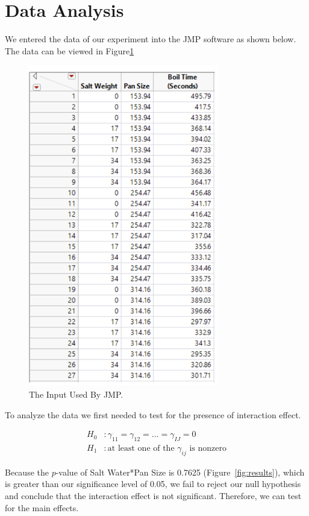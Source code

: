 \documentclass[12pt,titlepage=false]{scrartcl}
\begin{document}
\section{Data Analysis}
\label{sec:data_analysis}
We entered the data of our experiment into the JMP software as shown below. The data can be viewed in Figure\ref{fig:inputs}

\begin{figure}[H]
    \centering
    \includegraphics[width=0.5\linewidth]{inputs}
    \caption{The Input Used By JMP.}
    \label{fig:inputs}
\end{figure}

To analyze the data we first needed to test for the presence of interaction effect.

\begin{align*}
    H_0&: \gamma_{11} = \gamma_{12} = \ldots = \gamma_{IJ} = 0 \\
    H_1&: \text{at least one of the $\gamma_{ij}$ is nonzero}
\end{align*}

Because the $p$-value of Salt Water*Pan Size is \num{0.7625} (Figure~\ref{fig:results}), which is greater than our significance level of \num{0.05}, we fail to reject our null hypothesis and conclude that the interaction effect is not significant. Therefore, we can test for the main effects.
\end{document}
